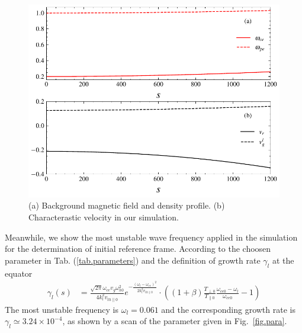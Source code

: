     \begin{figure}[htbp]
        \centering
        \includegraphics[scale=0.5]{cpc_img/fig_profile.pdf}
        \caption{(a) Background magnetic field and density profile. (b) Characterastic velocity in our simulation.}
        \label{fig.profile}
    \end{figure}
Meanwhile, we show the most unstable wave frequency applied in the simulation for the determination of initial reference frame. According to the choosen parameter in Tab. (\ref{tab.parameters}) and the definition of growth rate  $\gamma_l$ at the equator
\begin{equation}
\begin{aligned}
    \gamma_l(s) & =\frac{\sqrt{2 \pi} \omega_{c e} v_g \omega_{h 0}^2}{4 k_l^2 v_{t h \| 0}} e^{-\frac{\left(\omega_l-\omega_{c e}\right)^2}{2 k_l^2 v_{t h \| 0}}}
    \cdot \left((1+\beta) \frac{T_{\perp 0}}{T_{\| 0}} \frac{\omega_{c e 0}-\omega_l}{\omega_{c e 0}}-1\right)
    \end{aligned}
\end{equation}
The most unstable frequency is $\omega_l = 0.061$ and the corresponding growth rate is $\gamma_l \simeq 3.24\times 10^{-4}$, as shown by a scan of the parameter given in Fig.~\ref{fig.para}.
